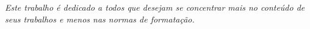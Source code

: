 \begin{dedicatoria}
   \vspace*{\fill}
   \centering
   \noindent
   \textit{Este trabalho é dedicado a todos que desejam se concentrar mais no conteúdo de seus trabalhos e menos nas normas de formatação.} \vspace*{\fill}
\end{dedicatoria}
